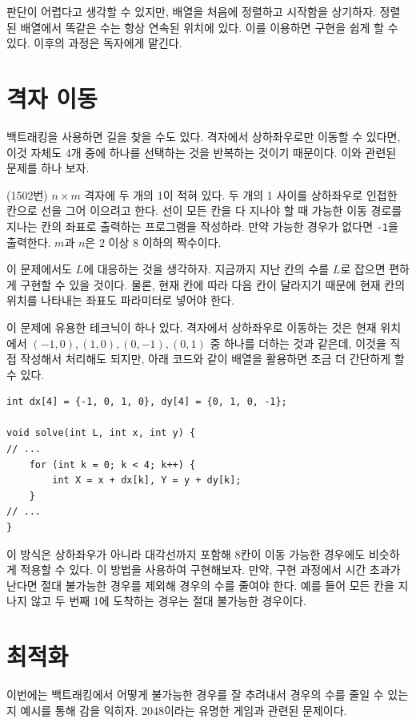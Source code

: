 판단이 어렵다고 생각할 수 있지만, 배열을 처음에 정렬하고 시작함을 상기하자. 정렬된 배열에서 똑같은 수는 항상 연속된 위치에 있다. 이를 이용하면 구현을 쉽게 할 수 있다. 이후의 과정은 독자에게 맡긴다.

\section{격자 이동}
백트래킹을 사용하면 길을 찾을 수도 있다. 격자에서 상하좌우로만 이동할 수 있다면, 이것 자체도 4개 중에 하나를 선택하는 것을 반복하는 것이기 때문이다. 이와 관련된 문제를 하나 보자.

\begin{example} \label{ex: boj-1502}
    (1502번) $n \times m$ 격자에 두 개의 1이 적혀 있다. 두 개의 1 사이를 상하좌우로 인접한 칸으로 선을 그어 이으려고 한다. 선이 모든 칸을 다 지나야 할 때 가능한 이동 경로를 지나는 칸의 좌표로 출력하는 프로그램을 작성하라. 만약 가능한 경우가 없다면 \texttt{-1}을 출력한다. $m$과 $n$은 $2$ 이상 $8$ 이하의 짝수이다.
\end{example}

이 문제에서도 $L$에 대응하는 것을 생각하자. 지금까지 지난 칸의 수를 $L$로 잡으면 편하게 구현할 수 있을 것이다. 물론, 현재 칸에 따라 다음 칸이 달라지기 때문에 현재 칸의 위치를 나타내는 좌표도 파라미터로 넣어야 한다.

이 문제에 유용한 테크닉이 하나 있다. 격자에서 상하좌우로 이동하는 것은 현재 위치에서 $(-1, 0), (1, 0), (0, -1), (0, 1)$ 중 하나를 더하는 것과 같은데, 이것을 직접 작성해서 처리해도 되지만, 아래 코드와 같이 배열을 활용하면 조금 더 간단하게 할 수 있다.

\begin{lstlisting}
int dx[4] = {-1, 0, 1, 0}, dy[4] = {0, 1, 0, -1};

void solve(int L, int x, int y) {
// ...
    for (int k = 0; k < 4; k++) {
        int X = x + dx[k], Y = y + dy[k];
    }
// ...
}
\end{lstlisting}

이 방식은 상하좌우가 아니라 대각선까지 포함해 8칸이 이동 가능한 경우에도 비슷하게 적용할 수 있다. 이 방법을 사용하여 구현해보자. 만약, 구현 과정에서 시간 초과가 난다면 절대 불가능한 경우를 제외해 경우의 수를 줄여야 한다. 예를 들어 모든 칸을 지나지 않고 두 번째 1에 도착하는 경우는 절대 불가능한 경우이다.

\section{최적화}
이번에는 백트래킹에서 어떻게 불가능한 경우를 잘 추려내서 경우의 수를 줄일 수 있는지 예시를 통해 감을 익히자. 2048이라는 유명한 게임과 관련된 문제이다.

